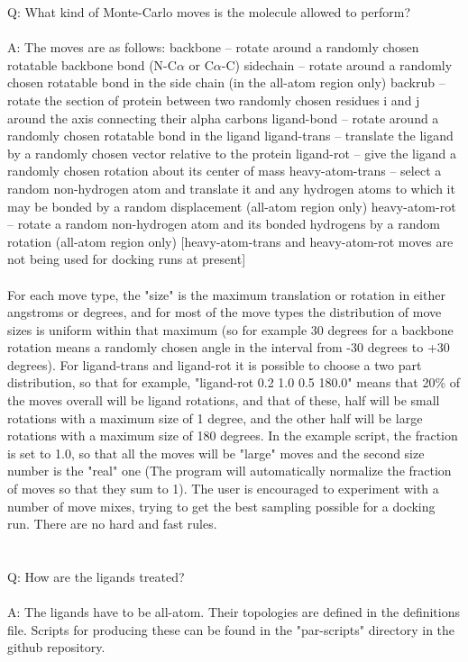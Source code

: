 \documentclass{article}      %
\begin{document}
Q:  What kind of Monte-Carlo moves is the molecule allowed to perform?
\\\\
A:  The moves are as follows:
backbone -- rotate around a randomly chosen rotatable backbone bond (N-C$\alpha$ or C$\alpha$-C)
sidechain -- rotate around a randomly chosen rotatable bond in the side chain (in the all-atom region only)
backrub -- rotate the section of protein between two randomly chosen residues i and j around the axis connecting their alpha carbons
ligand-bond -- rotate around a randomly chosen rotatable bond in the ligand
ligand-trans -- translate the ligand by a randomly chosen vector relative to the protein
ligand-rot -- give the ligand a randomly chosen rotation about its center of mass
heavy-atom-trans -- select a random non-hydrogen atom and translate it and any hydrogen atoms to which it may be bonded by a random displacement (all-atom region only)
heavy-atom-rot -- rotate a random non-hydrogen atom and its bonded hydrogens by a random rotation (all-atom region only)
[heavy-atom-trans and heavy-atom-rot moves are not being used for docking runs at present]
\\\\
For each move type, the "size" is the maximum translation or rotation in either angstroms or degrees, and for most of the move types the distribution of move sizes is uniform within that maximum (so for example 30 degrees for a backbone rotation means a randomly chosen angle in the interval from -30 degrees to +30 degrees). For ligand-trans and ligand-rot it is possible to choose a two part distribution, so that for example, "ligand-rot 0.2 1.0 0.5 180.0" means that 20\% of the moves overall will be ligand rotations, and that of these, half will be small rotations with a maximum size of 1 degree, and the other half will be large rotations with a maximum size of 180 degrees. In the example script, the fraction is set to 1.0, so that all the moves will be "large" moves and the second size number is the "real" one (The program will automatically normalize the fraction of moves so that they sum to 1). The user is encouraged to experiment with a number of move mixes, trying to get the best sampling possible for a docking run. There are no hard and fast rules.
\\\\\\
Q:  How are the ligands treated?
\\\\
A:  The ligands have to be all-atom. Their topologies are defined in the definitions file. Scripts for producing these can be found in the "par-scripts" directory in the github repository.
\end{document}
